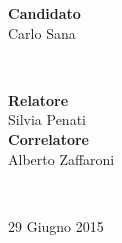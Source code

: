 \begin{titlepage}
 \vspace{8.7cm}

\begin{minipage}{0.4\textwidth}
\begin{flushleft} \large
\textbf{Candidato}\\
\textsf{Carlo Sana}
\end{flushleft}

\vfill
\end{minipage}
~
\begin{minipage}{0.4\textwidth}
\begin{flushright} \large
\textbf{Relatore} \\
\textsf{Silvia Penati}
\\[0.5cm]
\textbf{Correlatore}\\
\textsf{Alberto Zaffaroni}
\end{flushright}
\end{minipage}\\

\vfill


{\large 29 Giugno 2015}


 
%

\end{titlepage}